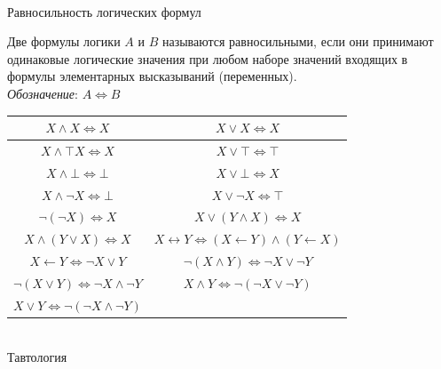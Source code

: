 \begin{frame}{\\Равносильность логических формул}
	\topline
	\justifying
	\\
	\footnotesize{
		Две формулы логики $A$ и $B$ называются равносильными, если они принимают одинаковые логические значения при любом наборе значений входящих в формулы элементарных высказываний (переменных).\\
		\textit{Обозначение}: $A \iff B$
		\begin{center}
			\begin{tabular}{|c|c|}
				\hline
				$X \land X \iff X$ & $X \lor X \iff X$\\
				\hline
				$X \land \top X \iff X$ & $X \lor \top \iff \top$\\
				\hline
				$X \land \bot \iff \bot$ & $X \lor \bot \iff X$\\
				\hline
				$X \land \neg X \iff \bot$ & $X \lor \neg X \iff \top$\\
				\hline
				$\neg(\neg X) \iff X$ & $X \lor (Y \land X) \iff X$\\
				\hline
				$X \land (Y \lor X) \iff X$ & $X \leftrightarrow Y \iff (X \leftarrow Y) \land (Y \leftarrow X)$\\
				\hline
				$X \leftarrow Y \iff \neg X \lor Y$ & $\neg(X \land Y) \iff \neg X \lor \neg Y$\\
				\hline
				$\neg(X \lor Y) \iff \neg X \land \neg Y$ & $X \land Y \iff \neg(\neg X \lor \neg Y)$\\
				\hline
				$X \lor Y \iff \neg(\neg X \land \neg Y)$ &\\
				\hline
			\end{tabular}
		\end{center}
	}
\end{frame}

\begin{frame}{\\Тавтология}
	\topline
	\justifying
	\begin{SCn}
	\end{SCn}
\end{frame}


